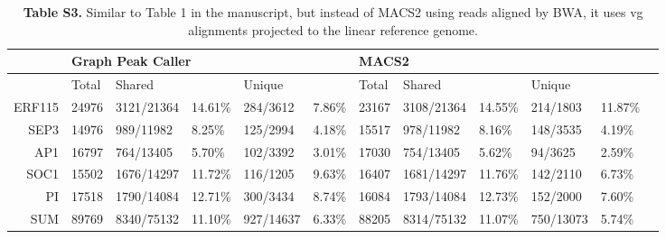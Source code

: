 \documentclass[a4paper,8pt]{article}
\title{}
\author{}
\begin{document}
\begin{table}[]
\begin{adjustwidth}{-1.05in}{0in} %
\centering
\caption*{\textbf{Table S3.} Similar to Table 1 in the manuscript, but instead of MACS2 using reads aligned by BWA, it uses vg alignments projected to the linear reference genome.}

\label{table1}
\begin{tabular}{llllllllllll}
\toprule
 & \multicolumn{5}{l|}{Graph Peak Caller}                        & \multicolumn{5}{l}{MACS2}                       \\ \midrule
 &  \multicolumn{1}{|l}{Total} & \multicolumn{2}{l}{Shared} & \multicolumn{2}{l|}{Unique} & Total & \multicolumn{2}{l}{Shared} & \multicolumn{2}{l}{Unique} \\ \midrule
\multicolumn{1}{r|}{ERF115} & 24976 & 3121/21364 & 14.61\% & 284/3612 & 7.86\% & \multicolumn{1}{|l}{23167} & 3108/21364 & 14.55\% & 214/1803 & 11.87\% & \\ 
\multicolumn{1}{r|}{SEP3} & 14976 & 989/11982 & 8.25\% & 125/2994 & 4.18\% & \multicolumn{1}{|l}{15517} & 978/11982 & 8.16\% & 148/3535 & 4.19\% & \\ 
\multicolumn{1}{r|}{AP1} & 16797 & 764/13405 & 5.70\% & 102/3392 & 3.01\% & \multicolumn{1}{|l}{17030} & 754/13405 & 5.62\% & 94/3625 & 2.59\% & \\ 
\multicolumn{1}{r|}{SOC1} & 15502 & 1676/14297 & 11.72\% & 116/1205 & 9.63\% & \multicolumn{1}{|l}{16407} & 1681/14297 & 11.76\% & 142/2110 & 6.73\% & \\ 
\multicolumn{1}{r|}{PI} & 17518 & 1790/14084 & 12.71\% & 300/3434 & 8.74\% & \multicolumn{1}{|l}{16084} & 1793/14084 & 12.73\% & 152/2000 & 7.60\% & \\ 
\midrule\multicolumn{1}{r|}{SUM} & 89769 & 8340/75132 & 11.10\% & 927/14637 & 6.33\% & \multicolumn{1}{|l}{88205} & 8314/75132 & 11.07\% & 750/13073 & 5.74\% & \\ 

\bottomrule
\end{tabular}
\end{adjustwidth}
\end{table}
\end{document}
